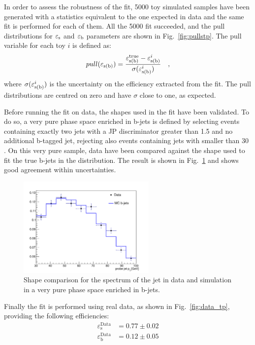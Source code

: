 In order to assess the robustness of the fit, 5000 toy simulated samples have been generated with a statistics equivalent to the one expected in data and the same fit is performed for each of them. All the 5000 fit succeeded, and the pull distributions for $\varepsilon_{\rm s}$ and $\varepsilon_{\rm b}$ parameters are shown in Fig.~\ref{fig:pullstp}. The pull variable for each toy $i$ is defined as:
\begin{equation}
pull(\varepsilon_{\rm s (b)}) = \frac{\varepsilon_{\rm s (b)}^{\rm true} - \varepsilon_{\rm s (b)}^{i}}{\sigma(\varepsilon_{\rm s (b)}^{i})} \quad,
\end{equation}
\noindent where $\sigma(\varepsilon_{\rm s (b)}^{i})$ is the uncertainty on the efficiency extracted from the fit. The pull distributions are centred on zero and have $\sigma$ close to one, as expected.

Before running the fit on data, the shapes used in the fit have been validated. To do so, a very pure phase space enriched in b-jets is defined by selecting events containing exactly two jets with a JP discriminator greater than 1.5 and no additional b-tagged jet, rejecting also events containing jets with \pt smaller than 30 \GeV. On this very pure sample, data have been compared against the shape used to fit the true b-jets in the \tpp distribution. The result is shown in Fig.~\ref{fig:purett} and shows good agreement within uncertainties.

\begin{figure}[htb]
\centering
\includegraphics[width=0.6\textwidth]{images/passprobe_data_mc-v2.pdf}
\caption{Shape comparison for the \pt spectrum of the \probe jet in data and simulation in a very pure phase space enriched in b-jets.\label{fig:purett}}
\end{figure}

Finally the fit is performed using real data, as shown in Fig.~\ref{fig:data_tp}, providing the following efficiencies:
\begin{equation}
\begin{split}
\varepsilon_\mathrm{s}^\mathrm{Data} &= 0.77\pm0.02\\
\varepsilon_\mathrm{b}^\mathrm{Data} &= 0.12\pm0.05
\end{split}
\end{equation}

